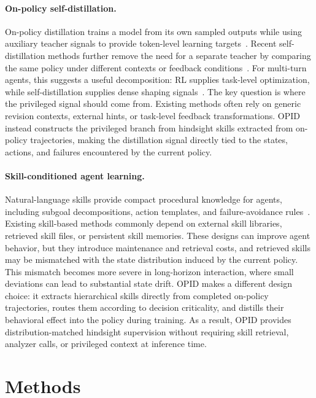 \documentclass{llmxive}
\begin{document}
\paragraph{On-policy self-distillation.}
On-policy distillation trains a model from its own sampled outputs while using auxiliary teacher signals to provide token-level learning targets~\citep{agarwal2024onpolicy,gu2023minillm}. Recent self-distillation methods further remove the need for a separate teacher by comparing the same policy under different contexts or feedback conditions~\citep{zhao2026opsd,he2026sdzero}. For multi-turn agents, this suggests a useful decomposition: RL supplies task-level optimization, while self-distillation supplies dense shaping signals~\citep{lu2026sdar}. The key question is where the privileged signal should come from. Existing methods often rely on generic revision contexts, external hints, or task-level feedback transformations. OPID instead constructs the privileged branch from hindsight skills extracted from on-policy trajectories, making the distillation signal directly tied to the states, actions, and failures encountered by the current policy.

\paragraph{Skill-conditioned agent learning.}
Natural-language skills provide compact procedural knowledge for agents, including subgoal decompositions, action templates, and failure-avoidance rules~\citep{lu2026skill0,wang2026skillsd,lu2026sdar,wu2026maestro}. Existing skill-based methods commonly depend on external skill libraries, retrieved skill files, or persistent skill memories. These designs can improve agent behavior, but they introduce maintenance and retrieval costs, and retrieved skills may be mismatched with the state distribution induced by the current policy. This mismatch becomes more severe in long-horizon interaction, where small deviations can lead to substantial state drift. OPID makes a different design choice: it extracts hierarchical skills directly from completed on-policy trajectories, routes them according to decision criticality, and distills their behavioral effect into the policy during training. As a result, OPID provides distribution-matched hindsight supervision without requiring skill retrieval, analyzer calls, or privileged context at inference time.

\section{Methods}
\end{document}
